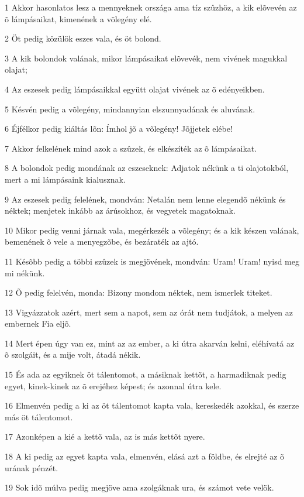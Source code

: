 \par 1 Akkor hasonlatos lesz a mennyeknek országa ama tíz szûzhöz, a kik elõvevén az õ lámpásaikat, kimenének a võlegény elé.
\par 2 Öt pedig közülök eszes vala, és öt bolond.
\par 3 A kik bolondok valának, mikor lámpásaikat elõvevék, nem vivének magukkal olajat;
\par 4 Az eszesek pedig lámpásaikkal együtt olajat vivének az õ edényeikben.
\par 5 Késvén pedig a võlegény, mindannyian elszunnyadának és aluvának.
\par 6 Éjfélkor pedig kiáltás lõn: Ímhol jõ a võlegény! Jõjjetek elébe!
\par 7 Akkor felkelének mind azok a szûzek, és elkészíték az õ lámpásaikat.
\par 8 A bolondok pedig mondának az eszeseknek: Adjatok nékünk a ti olajotokból, mert a mi lámpásaink kialusznak.
\par 9 Az eszesek pedig felelének, mondván: Netalán nem lenne elegendõ nékünk és néktek; menjetek inkább az árúsokhoz, és vegyetek magatoknak.
\par 10 Mikor pedig venni járnak vala, megérkezék a võlegény; és a kik készen valának, bemenének õ vele a menyegzõbe, és bezáraték az ajtó.
\par 11 Késõbb pedig a többi szûzek is megjövének, mondván: Uram! Uram! nyisd meg mi nékünk.
\par 12 Õ pedig felelvén, monda: Bizony mondom néktek, nem ismerlek titeket.
\par 13 Vigyázzatok azért, mert sem a napot, sem az órát nem tudjátok, a melyen az embernek Fia eljõ.
\par 14 Mert épen úgy van ez, mint az az ember, a ki útra akarván kelni, eléhívatá az õ szolgáit, és a mije volt, átadá nékik.
\par 15 És ada az egyiknek öt tálentomot, a másiknak kettõt, a harmadiknak pedig egyet, kinek-kinek az õ erejéhez képest; és azonnal útra kele.
\par 16 Elmenvén pedig a ki az öt tálentomot kapta vala, kereskedék azokkal, és szerze más öt tálentomot.
\par 17 Azonképen a kié a kettõ vala, az is más kettõt nyere.
\par 18 A ki pedig az egyet kapta vala, elmenvén, elásá azt a földbe, és elrejté az õ urának pénzét.
\par 19 Sok idõ múlva pedig megjöve ama szolgáknak ura, és számot vete velök.
